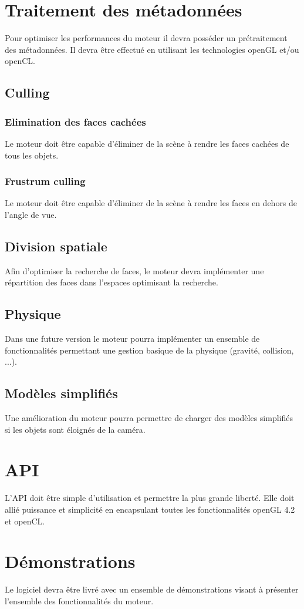 \documentclass [a4 paper,11pt]{article}
\begin{document}
\section{Traitement des métadonnées}
Pour optimiser les performances du moteur il devra posséder un prétraitement des métadonnées.
Il devra être effectué en utilisant les technologies openGL et/ou openCL.

\subsection{Culling}
\subsubsection*{Elimination des faces cachées}
Le moteur doit être capable d'éliminer de la scène à rendre les faces cachées de tous les objets.
\subsubsection*{Frustrum culling}
Le moteur doit être capable d'éliminer de la scène à rendre les faces en dehors de l'angle de vue.

\subsection{Division spatiale}
Afin d'optimiser la recherche de faces, le moteur devra implémenter une répartition des faces dans l'espaces optimisant la recherche.

\subsection{Physique}
Dans une future version le moteur pourra implémenter un ensemble de fonctionnalités permettant une gestion basique de la physique (gravité, collision, ...).

\subsection{Modèles simplifiés}
Une amélioration du moteur pourra permettre de charger des modèles simplifiés si les objets sont éloignés de la caméra.

\section{API}
L'API doit être simple d'utilisation et permettre la plus grande liberté.
Elle doit allié puissance et simplicité en encapsulant toutes les fonctionnalités openGL 4.2 et openCL.

\section{Démonstrations}
Le logiciel devra être livré avec un ensemble de démonstrations visant à présenter l'ensemble des fonctionnalités du moteur.
\end{document}
